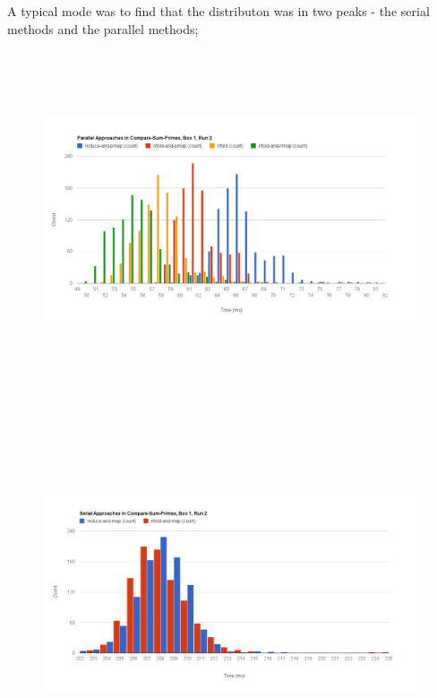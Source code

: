 \documentclass[12pt]{article}
\begin{document}
A typical mode was to find that the distributon was in two peaks - the serial methods and the parallel methods; 
\begin{figure}[h]
\includegraphics[trim = 10mm 0mm 30mm 0mm, clip, width = 16cm,height = 10cm]{PSP-B1}
\end{figure}
\begin{figure}[h!]
\includegraphics[trim = 10mm 0mm 0mm 5mm, clip, width = 16cm,height = 11cm]{SSP-B1}
\end{figure}
\end{document}
